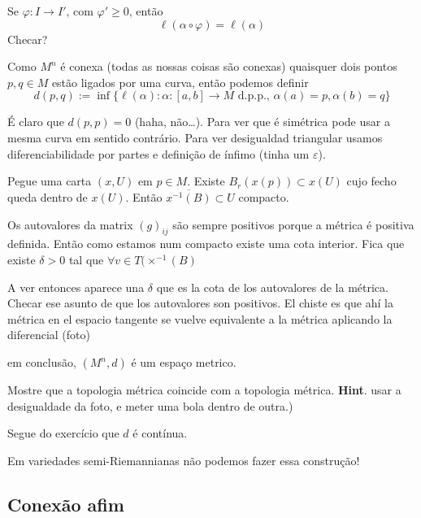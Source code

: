 \begin{remark}\leavevmode
Se \(\varphi:I \to I'\), com \(\varphi' \geq 0\), então
\[\ell(\alpha \circ \varphi) = \ell(\alpha)\]
{\color{4}Checar?}
\end{remark}

Como \(M^n\) é conexa (todas as nossas coisas são conexas) quaisquer dois pontos \(p,q \in M\) estão ligados por uma curva, então podemos definir
\[d(p,q):= \operatorname{inf}\{ \ell (\alpha):\alpha:[a,b] \to M \text{ d.p.p., }\alpha(a)=p,\alpha(b)=q \}\]

É claro que \(d(p,p)=0\) (haha, não…). Para ver que é simétrica pode usar a mesma curva em sentido contrário. Para ver desigualdad triangular usamos diferenciabilidade por partes e definição de ínfimo (tinha um \(\varepsilon\)).

Pegue uma carta  \((x,U)\) em \(p \in M\). Existe \(B_r(x(p)) \subset x(U)\) cujo fecho queda dentro de \(x (U)\). Então \(\overline{x^{-1}(B)} \subset U\) compacto.

Os autovalores da matrix \((g)_{ij}\) são sempre positivos porque a métrica é positiva definida. Então como estamos num compacto existe uma cota interior. Fica que existe \(\delta>0\) tal que \(\forall  v \in T(\times^{-1}(B)\)


A ver entonces aparece una \(\delta\) que es la cota de los autovalores de la métrica. {\color{7}Checar} ese asunto de que los autovalores son positivos. El chiste es que ahí la métrica en el espacio tangente se vuelve equivalente a la métrica aplicando la diferencial (foto)

em conclusão, \((M^n, d)\) é um espaço metrico.

\begin{exercise}\leavevmode
Mostre que a topologia métrica coincide com a topologia métrica. \textbf{Hint}. usar a desigualdade da foto, e meter uma bola dentro de outra.)
\end{exercise}

Segue do exercício 	que \(d\) é contínua.

\begin{remark}\leavevmode
Em variedades semi-Riemannianas não podemos fazer essa construção!
\end{remark}

\subsection{Conexão afim}

